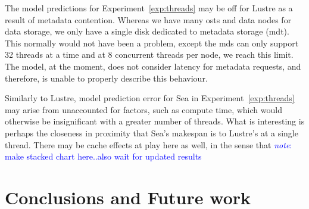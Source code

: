 \documentclass{report}
\newcommand{\note}[1]{\textcolor{blue}{\textit{note}: #1}}
\begin{document}
    The model predictions for Experiment~\ref{exp:threads} may be off for Lustre as a result
    of metadata contention. Whereas we have many \gls{ost}s and data nodes for
    data storage, we only have a single disk dedicated to metadata storage (\gls{mdt}).
    This normally would not have been a problem, except the \gls{mds} can only support
    32 threads at a time and at 8 concurrent threads per node, we reach this limit.
    The model, at the moment, does not consider latency for metadata requests, and 
    therefore, is unable to properly describe this behaviour.

    Similarly to Lustre, model prediction error for Sea in Experiment~\ref{exp:threads}
    may arise from unaccounted for factors, such as compute time, which would otherwise
    be insignificant with a greater number of threads. What is interesting is perhaps
    the closeness in proximity that Sea's makespan is to Lustre's at a single thread.
    There may be cache effects at play here as well, in the sense that 
    \note{make stacked chart here..also wait for updated results}













    \chapter{Conclusions and Future work}
\end{document}
